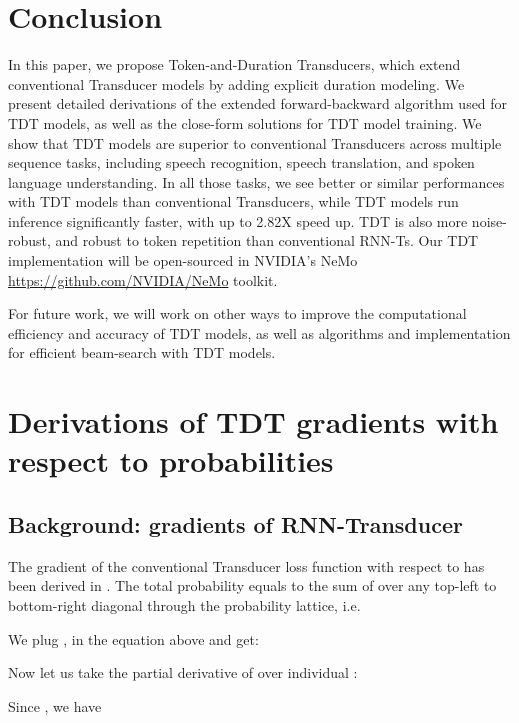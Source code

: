 \documentclass{article}
\begin{document}
\section{Conclusion}\label{future}
In this paper, we propose Token-and-Duration Transducers, which extend conventional Transducer models by adding explicit duration modeling.
We present detailed derivations of the extended forward-backward algorithm used for TDT models, as well as the close-form solutions for TDT model training. We show that TDT models are superior to conventional Transducers across multiple sequence tasks, including speech recognition, speech translation, and spoken language understanding. In all those tasks, we see better or similar performances with TDT models than conventional Transducers, while TDT models run inference significantly faster, with up to 2.82X speed up. TDT is also more noise-robust, and robust to token repetition than conventional RNN-Ts.
Our TDT implementation  will be open-sourced in NVIDIA's NeMo \url{https://github.com/NVIDIA/NeMo} toolkit.

For future work, we will work on other ways to improve the computational efficiency and accuracy of TDT models, as well as algorithms and implementation for efficient beam-search with TDT models. 





\nocite{langley00}




\newpage
\appendix
\onecolumn

\section{ Derivations of TDT gradients with respect to probabilities}
\subsection{Background: gradients of RNN-Transducer}
The gradient of the conventional Transducer loss 
function with respect to  has been derived in \cite{graves2012sequence}.  The total probability  equals to the sum of  over any top-left to bottom-right diagonal through the probability lattice, i.e. 

We plug , in the equation above and get: 

Now let us take the partial derivative of  over individual : 

Since , we have
\end{document}
